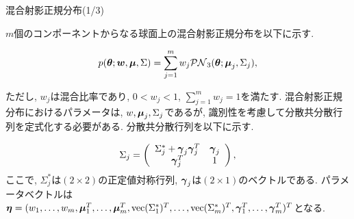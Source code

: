\documentclass[dvipdfmx]{beamer} %
\newcommand{\bm}[1]{\mbox{\boldmath $#1$}}
\begin{document}
\begin{frame}{混合射影正規分布(1/3)}

$m$個のコンポーネントからなる球面上の混合射影正規分布を以下に示す. 

\vspace{-0.3cm}
\begin{eqnarray*}
\label{MPNS}
p(\bm \theta;\bm w,\bm \mu, \Sigma) = \sum^m_{j=1} w_j \mathcal{PN}_3(\bm \theta;\bm \mu_j, \Sigma_j),
\end{eqnarray*}

\noindent
ただし, $w_j$は混合比率であり, $0 < w_j < 1$, $\sum^m_{j=1} w_j = 1$を満たす. 混合射影正規分布におけるパラメータは, $w, \bm \mu_j, \Sigma_j$であるが, 識別性を考慮して分散共分散行列を定式化する必要がある. 分散共分散行列を以下に示す.

\vspace{-0.3cm}
\begin{eqnarray*}
\label{SIGMA}
 \Sigma_j = \left(
    \begin{array}{cc}
      \Sigma^*_j + \bm \gamma_j \bm \gamma_j^T & \bm \gamma_j \\
      \bm \gamma_j^T & 1
    \end{array}
  \right),
\end{eqnarray*}
\noindent
ここで, $\Sigma^*_j$は$(2 \times 2)$の正定値対称行列, $\bm \gamma_j$は$(2 \times 1)$のベクトルである. パラメータベクトルは$\bm \eta = (w_1, \dots, w_m, \bm \mu_1^T, \dots, \bm \mu_m^T, \mbox{vec}(\Sigma^*_1)^T, \dots, \mbox{vec}(\Sigma^*_m)^T, \bm \gamma_1^T, \dots, \bm \gamma_m^T)^T$となる.

\end{frame}
\end{document}
